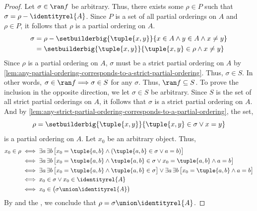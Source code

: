 \begin{proof}
    \vspace{0.2cm}
    \noindent
    Let \( \sigma \in \ran f \) be arbitrary. Thus, there exists some \( \rho \in P \) such that \( \sigma = \rho - \identityrel{A} \). Since \( P \) is a set of all
    partial orderings on \( A \) and \( \rho \in P \), it follows that \( \rho \) is a partial ordering on \( A \).
    \begin{align*}
        \sigma &= \rho - \setbuilderbig{\tuple{x,y}}{x \in A \land y \in A \land x \neq y}\\
               &= \setbuilderbig{\tuple{x,y}}{\tuple{x,y} \in \rho \land x \neq y}
    \end{align*}
    Since \( \rho \) is a partial ordering on \( A \), \( \sigma \) must be a strict partial ordering on \( A \)
    by \cref{lem:any-partial-ordering-corresponds-to-a-strict-partial-ordering}.
    Thus, \( \sigma \in S \). In other words, \( \sigma \in \ran f {\implies} \sigma \in S \) for any \( \sigma \). Thus, \( \ran f \subseteq S \). To prove the inclusion
    in the opposite direction, we let \( \sigma \in S \) be arbitrary. Since \( S \) is the set of all strict partial orderings on \( A \), it follows that
    \( \sigma \) is a strict partial ordering on \( A \). And by \cref{lem:any-strict-partial-ordering-corresponds-to-a-partial-ordering}, the set,
    \begin{equation*}
        \rho = \setbuilderbig{\tuple{x,y}}{\tuple{x,y} \in \sigma \lor x = y}
    \end{equation*}
    is a partial ordering on \( A \). Let \( x_{0} \) be an arbitrary object. Thus,
    \begin{align*}
        x_{0} \in \rho
        &\iff
        \exists a \, \exists b \, \big[ x_{0} = \tuple{a,b} \land \mleft( \tuple{a,b} \in \sigma \lor a = b \mright) \big]\\
        &\iff
        \exists a \, \exists b \, \big[ x_{0} = \tuple{a,b} \land \tuple{a,b} \in \sigma \lor x_{0} = \tuple{a,b} \land a = b \big]\\
        &\iff
        \exists a \, \exists b \, \big[ x_{0} = \tuple{a,b} \land \tuple{a,b} \in \sigma \big] \lor
        \exists a \, \exists b \, \big[ x_{0} = \tuple{a,b} \land a = b \big]\\
        &\iff
        x_{0} \in \sigma \lor x_{0} \in \identityrel{A}\\
        &\iff
        x_{0} \in \big( \sigma \union \identityrel{A} \big)
    \end{align*}
    By  and the , we conclude that \( \rho = \sigma \union \identityrel{A} \).

\end{proof}
